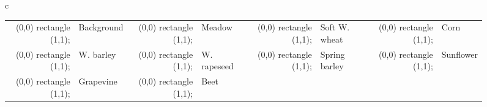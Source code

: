 \begin{figure}[th!]
    \centering
\begin{tabular}{c}
    \begin{tabular}{rlrlrlrl}
 \definecolor{tempcolor}{rgb}{0,0,0}
           \tikz \fill[fill=tempcolor, scale=0.3, draw=black] (0,0) rectangle (1,1);
           & \footnotesize{Background} 
           &
           \definecolor{tempcolor}{rgb}{0.6823529411764706, 0.7803921568627451, 0.9098039215686274}
           \tikz \fill[fill=tempcolor, scale=0.3, draw=black] (0,0) rectangle (1,1); 
           & \footnotesize{Meadow}
           &
           \definecolor{tempcolor}{rgb}{1.0, 0.4980392156862745, 0.054901960784313725}
           \tikz \fill[fill=tempcolor, scale=0.3, draw=black] (0,0) rectangle (1,1); 
           & \footnotesize{Soft W. wheat}
           &
           \definecolor{tempcolor}{rgb}{1.0, 0.7333333333333333, 0.47058823529411764}
           \tikz \fill[fill=tempcolor, scale=0.3, draw=black] (0,0) rectangle (1,1);
           & \footnotesize{Corn}
           \\
           \definecolor{tempcolor}{rgb}{0.17254901960784313, 0.6274509803921569, 0.17254901960784313}
           \tikz \fill[fill=tempcolor, scale=0.3, draw=black] (0,0) rectangle (1,1);
           & \footnotesize{W. barley} 
           &
           \definecolor{tempcolor}{rgb}{0.596078431372549, 0.8745098039215686, 0.5411764705882353}
           \tikz \fill[fill=tempcolor, scale=0.3, draw=black] (0,0) rectangle (1,1); 
           & \footnotesize{W. rapeseed}
           &
           \definecolor{tempcolor}{rgb}{0.8392156862745098, 0.15294117647058825, 0.1568627450980392}
           \tikz \fill[fill=tempcolor, scale=0.3, draw=black] (0,0) rectangle (1,1); 
           & \footnotesize{Spring barley}
           &
           \definecolor{tempcolor}{rgb}{1.0, 0.596078431372549, 0.5882352941176471}
           \tikz \fill[fill=tempcolor, scale=0.3, draw=black] (0,0) rectangle (1,1);
           & \footnotesize{Sunflower}
           \\
           \definecolor{tempcolor}{rgb}{0.5803921568627451, 0.403921568627451, 0.7411764705882353}
           \tikz \fill[fill=tempcolor, scale=0.3, draw=black] (0,0) rectangle (1,1);
           & \footnotesize{Grapevine} 
           &
           \definecolor{tempcolor}{rgb}{0.7725490196078432, 0.6901960784313725, 0.8352941176470589}
           \tikz \fill[fill=tempcolor, scale=0.3, draw=black] (0,0) rectangle (1,1); 
           & \footnotesize{Beet}
           &
           \definecolor{tempcolor}{rgb}{0.5490196078431373, 0.33725490196078434, 0.29411764705882354}

\end{tabular}
\end{tabular}
\end{figure}
